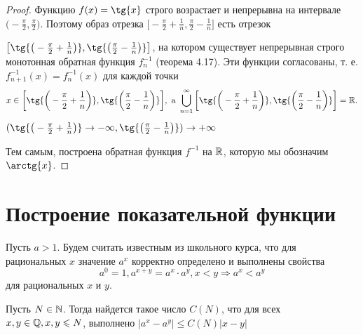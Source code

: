 	\begin{proof}
		Функцию $f(x) = \tg{x}$ строго возрастает и непрерывна на интервале $\big(-\frac{\pi}{2}, \frac{\pi}{2}\big)$. Поэтому образ отрезка $\big[-\frac{\pi}{2} + \frac{1}{n}, \frac{\pi}{2} - \frac{1}{n}\big]$ есть отрезок 
		
		$\big[\tg{\big(-\frac{\pi}{2} + \frac{1}{n}\big)}, \tg{\big(\frac{\pi}{2} - \frac{1}{n}\big)}\big]$, на котором существует непрерывная строго монотонная обратная функция $f^{-1}_n$ (теорема 4.17). Эти функции согласованы, т. е. $f^{-1}_{n + 1}(x) = f^{-1}_n(x)$ для каждой точки 
		\[ x \in \bigg[\tg{\bigg(-\frac{\pi}{2} + \frac{1}{n}\bigg)}, \tg{\bigg(\frac{\pi}{2} - \frac{1}{n}\bigg)}\bigg], \text{ a } \bigcup_{n = 1}^{\infty} \bigg[\tg{\bigg(-\frac{\pi}{2} + \frac{1}{n}\bigg)}, \tg{\bigg(\frac{\pi}{2} - \frac{1}{n}\bigg)}\bigg] = \R. \]
		$(\tg{\big(-\frac{\pi}{2} + \frac{1}{n}\big)} \to -\infty, \tg{\big(\frac{\pi}{2} - \frac{1}{n}\big)}) \to +\infty$
		
		Тем самым, построена обратная функция $f^{-1}$ на $\mathbb R$, которую мы обозначим $\arctg{x}$.
	\end{proof}
	
	\section{Построение показательной функции}
	
	Пусть $a > 1$. Будем считать известным из школьного курса, что для рациональных $x$ значение $a^x$ корректно определено и выполнены свойства
	\[ a^0 = 1, a^{x + y} = a^x \cdot a^y, x < y \Rightarrow a^x < a^y \]	
	для рациональных $x$ и $y$.
	
	\begin{lemma}
		Пусть $N \in \mathbb N$. Тогда найдется такое число $C(N)$, что для всех $x, y \in \mathbb Q, x, y \leqslant N$, выполнено $|a^x - a^y| \leqslant C(N)|x - y|$
	\end{lemma}
	
